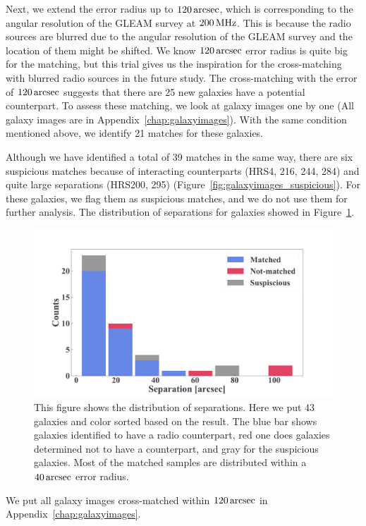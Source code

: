 Next, we extend the error radius up to $120\,\mathrm{arcsec}$, which is corresponding to the angular resolution of the GLEAM survey at $200\,\mathrm{MHz}$.
This is because the radio sources are blurred due to the angular resolution of the GLEAM survey and the location of them might be shifted.
We know $120\,\mathrm{arcsec}$ error radius is quite big for the matching, but this trial gives us the inspiration for the cross-matching with blurred radio sources in the future study.
The cross-matching with the error of $120\,\mathrm{arcsec}$ suggests that there are 25 new galaxies have a potential counterpart.
To assess these matching, we look at galaxy images one by one (All galaxy images are in Appendix~\ref{chap:galaxyimages}).
With the same condition mentioned above, we identify 21 matches for these galaxies.

Although we have identified a total of 39 matches in the same way, there are six suspicious matches because of interacting counterparts (HRS4, 216, 244, 284) and quite large separations (HRS200, 295) (Figure~\ref{fig:galaxyimages_suspicious}).
For these galaxies, we flag them as suspicious matches, and we do not use them for further analysis.
The distribution of separations for galaxies showed in Figure~\ref{fig:separation}.

\begin{figure}[htbp]
	\centering
	\includegraphics[width=.8\linewidth]{Chapter_4/Figures/Method_separation.pdf}
    \caption[Separation from the cross-matching]{\label{fig:separation}
        This figure shows the distribution of separations.
        Here we put 43 galaxies and color sorted based on the result.
        The blue bar shows galaxies identified to have a radio counterpart, red one does galaxies determined not to have a counterpart, and gray for the suspicious galaxies.
        Most of the matched samples are distributed within a $40\,\mathrm{arcsec}$ error radius.
    }
\end{figure}

We put all galaxy images cross-matched within $120\,\mathrm{arcsec}$ in Appendix~\ref{chap:galaxyimages}.



